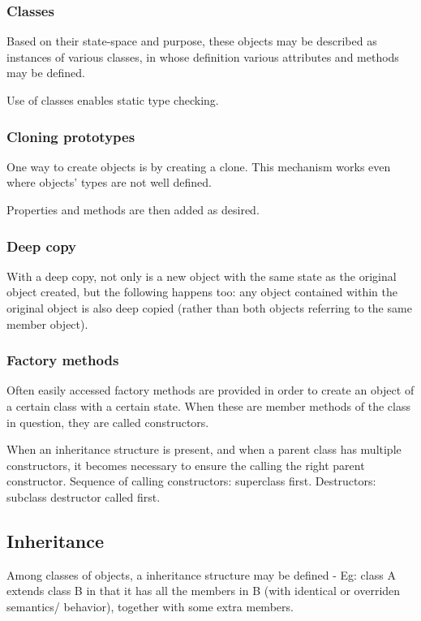 \documentclass[oneside, article]{memoir}
\begin{document}
\subsubsection{Classes}
Based on their state-space and purpose, these objects may be described as instances of various classes, in whose definition various attributes and methods may be defined.

Use of classes enables static type checking.

\subsubsection{Cloning prototypes}
One way to create objects is by creating a clone. This mechanism works even where objects' types are not well defined.

Properties and methods are then added as desired.

\subsubsection{Deep copy}
With a deep copy, not only is a new object with the same state as the original object created, but the following happens too: any object contained within the original object is also deep copied (rather than both objects referring to the same member object).

\subsubsection{Factory methods}
Often easily accessed factory methods are provided in order to create an object of a certain class with a certain state. When these are member methods of the class in question, they are called constructors.

When an inheritance structure is present, and when a parent class has multiple constructors, it becomes necessary to ensure the calling the right parent constructor. Sequence of calling constructors: superclass first. Destructors: subclass destructor called first.

\subsection{Inheritance}
Among classes of objects, a inheritance structure may be defined - Eg: class A extends class B in that it has all the members in B (with identical or overriden semantics/ behavior), together with some extra members.
\end{document}
